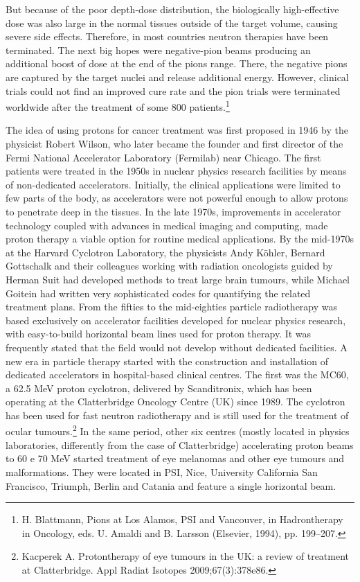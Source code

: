\documentclass[12pt, a4paper, twoside]{book}
\begin{document}
But because of the poor depth-dose distribution, the biologically high-effective dose was also large in the normal tissues outside of the target volume, causing severe side effects. Therefore, in most countries neutron therapies have been terminated.
The next big hopes were negative-pion beams producing an additional boost of dose at the end of the pions range. There, the negative pions are captured by the target nuclei and release additional energy. However, clinical trials could not find an improved cure rate and the pion trials were terminated worldwide after the treatment of some 800 patients.\footnote{H. Blattmann, Pions at Los Alamos, PSI and Vancouver, in Hadrontherapy in Oncology, eds. U. Amaldi and B. Larsson (Elsevier, 1994), pp. 199–207.}

The idea of using protons for cancer treatment was first proposed in 1946 by the physicist Robert Wilson, who later became the founder and first director of the Fermi National Accelerator Laboratory (Fermilab) near Chicago. The first patients were treated in the 1950s in nuclear physics research facilities by means of non-dedicated accelerators. Initially, the clinical applications were limited to few parts of the body, as accelerators were not powerful enough to allow protons to penetrate deep in the tissues.
In the late 1970s, improvements in accelerator technology coupled with advances in medical imaging and computing, made proton therapy a viable option for routine medical applications.
By the mid-1970s at the Harvard Cyclotron Laboratory, the physicists Andy K\"ohler, Bernard Gottschalk and their colleagues working with radiation oncologists guided by Herman Suit had developed methods to treat large brain tumours, while Michael Goitein had written very sophisticated codes for quantifying the related treatment plans.
From the fifties to the mid-eighties particle radiotherapy was based exclusively on accelerator facilities developed for nuclear physics research, with easy-to-build horizontal beam lines used for proton therapy. It was frequently stated that the field would not develop without dedicated facilities. A new era in particle therapy started with the construction and installation of dedicated accelerators in hospital-based clinical centres. The first was the MC60, a 62.5 MeV proton cyclotron, delivered by Scanditronix, which has been operating at the Clatterbridge Oncology Centre (UK) since 1989. The cyclotron has been used for fast neutron radiotherapy and is still used for the treatment of ocular tumours.\footnote{Kacperek A. Protontherapy of eye tumours in the UK: a review of treatment at
Clatterbridge. Appl Radiat Isotopes 2009;67(3):378e86.} In the same period, other six centres (mostly located in physics laboratories, differently from the case of Clatterbridge) accelerating proton beams to 60 e 70 MeV started treatment of eye melanomas and other eye tumours and malformations. They were located in PSI, Nice, University California San Francisco, Triumph, Berlin and Catania and feature a single horizontal beam.
\end{document}
